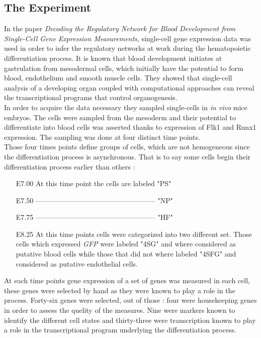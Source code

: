 \documentclass[a4paper,12pt]{book}
\theoremstyle{break}
\begin{document}
\subsection*{The Experiment}
	In the paper \textit{Decoding the Regulatory Network for Blood Development from Single-Cell Gene Expression Measurements}, single-cell gene expression data was used in order to infer the regulatory networks at work during the hematopoietic differentiation process. It is known that blood development
	initiates at gastrulation from mesodermal cells, which initially have the potential to form blood, endothelium and smooth muscle cells. They showed that single-cell analysis of a developing organ coupled with computational approaches can reveal the transcriptional programs that control organogenesis.\\
	In order to acquire the data necessary they sampled single-cells in \textit{in vivo} mice embryos. The cells were sampled from the mesoderm and their potential to differentiate into blood cells was asserted thanks to expression of Flk1 and Runx1 expression. The sampling was done at four distinct time points.\\
	Those four times points define groups of cells, which are not hemogeneous since the differentiation process is asynchronous. That is to say some cells begin their differentiation process earlier than others :
	\begin{itemize}
		\item[E7.00] At this time point the cells are labeled "PS"
		\item[E7.50] –––––––––––––––––––––––––––––––––– "NP"
		\item[E7.75] –––––––––––––––––––––––––––––––––– "HF"
		\item[E8.25] At this time points cells were categorized into two different set. Those cells which expressed \textit{GFP} were labeled "4SG" and where considered as putative blood cells while those that did not where labeled "4SFG" and considered as putative endothelial cells. 
	\end{itemize}
	At each time points gene expression of a set of genes was measured in each cell, these genes were selected by hand as they were known to play a role in the process. Forty-six genes were selected, out of those : four were housekeeping genes in order to assess the quelity of the measures. Nine were markers known to identify the different cell states and thirty-three were transcription known to play a role in the transcriptional program underlying the differentiation process. 
\end{document}

